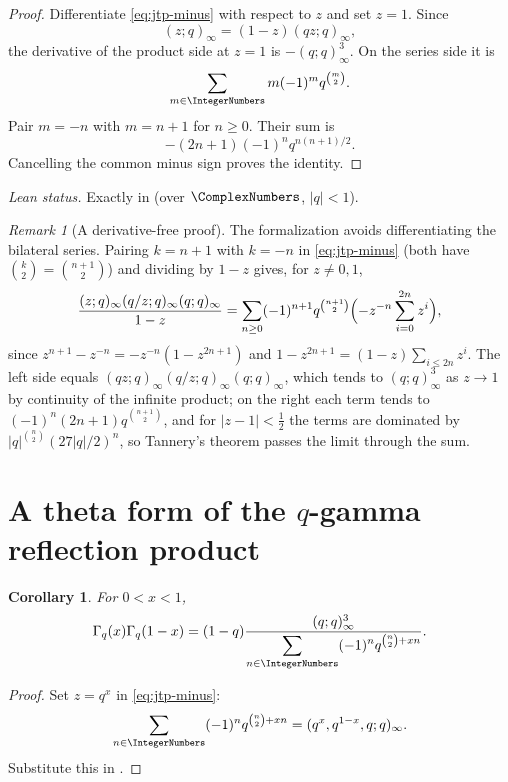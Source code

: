 \documentclass[11pt,a4paper,oneside,openany]{book}
\newtheorem{corollary}[corollary]{Corollary}
\theoremstyle{definition}
\theoremstyle{remark}
\newtheorem{remark}[remark]{Remark}
\begin{document}
\begin{proof}
Differentiate \eqref{eq:jtp-minus} with respect to $z$ and set $z=1$.  Since
\[
 (z;q)_\infty=(1-z)(qz;q)_\infty,
\]
the derivative of the product side at $z=1$ is $-(q;q)_\infty^3$.  On the series side it is
\[
 \sum_{m\in\IntegerNumbers}m(-1)^mq^{\binom m2}.
\]
Pair $m=-n$ with $m=n+1$ for $n\ge0$.  Their sum is
\[
 -(2n+1)(-1)^nq^{n(n+1)/2}.
\]
Cancelling the common minus sign proves the identity.
\end{proof}

\emph{Lean status.}  Exactly  in 
(over $\ComplexNumbers$, $|q|<1$).


\begin{remark}[A derivative-free proof]\label{rem:jacobi-cubic-formalization}
The formalization avoids differentiating the bilateral series.  Pairing
$k=n+1$ with $k=-n$ in \eqref{eq:jtp-minus} (both have
$\binom k2=\binom{n+1}2$) and dividing by $1-z$ gives, for $z\ne0,1$,
\[
 \frac{(z;q)_\infty(q/z;q)_\infty(q;q)_\infty}{1-z}
 =\sum_{n\ge0}(-1)^{n+1}q^{\binom{n+1}2}
 \Bigl(-z^{-n}\sum_{i=0}^{2n}z^i\Bigr),
\]
since $z^{n+1}-z^{-n}=-z^{-n}(1-z^{2n+1})$ and
$1-z^{2n+1}=(1-z)\sum_{i\le 2n}z^i$.  The left side equals
$(qz;q)_\infty(q/z;q)_\infty(q;q)_\infty$, which tends to $(q;q)_\infty^3$ as
$z\to1$ by continuity of the infinite product; on the right each term tends
to $(-1)^n(2n+1)q^{\binom{n+1}2}$, and for $\lvert z-1\rvert<\tfrac12$ the
terms are dominated by $\lvert q\rvert^{\binom n2}(27\lvert q\rvert/2)^n$, so
Tannery's theorem passes the limit through the sum.
\end{remark}

\section{A theta form of the \texorpdfstring{$q$}{q}-gamma reflection product}

\begin{corollary}\label{cor:qgamma-theta}
For $0<x<1$,
\[
 \Gamma_q(x)\Gamma_q(1-x)
 =(1-q)\frac{(q;q)_\infty^3}
 {\displaystyle\sum_{n\in\IntegerNumbers}(-1)^n
 q^{\binom n2+xn}}.
\]
\end{corollary}

\begin{proof}
Set $z=q^x$ in \eqref{eq:jtp-minus}:
\[
 \sum_{n\in\IntegerNumbers}(-1)^nq^{\binom n2+xn}
 =(q^x,q^{1-x},q;q)_\infty.
\]
Substitute this in .
\end{proof}
\end{document}

